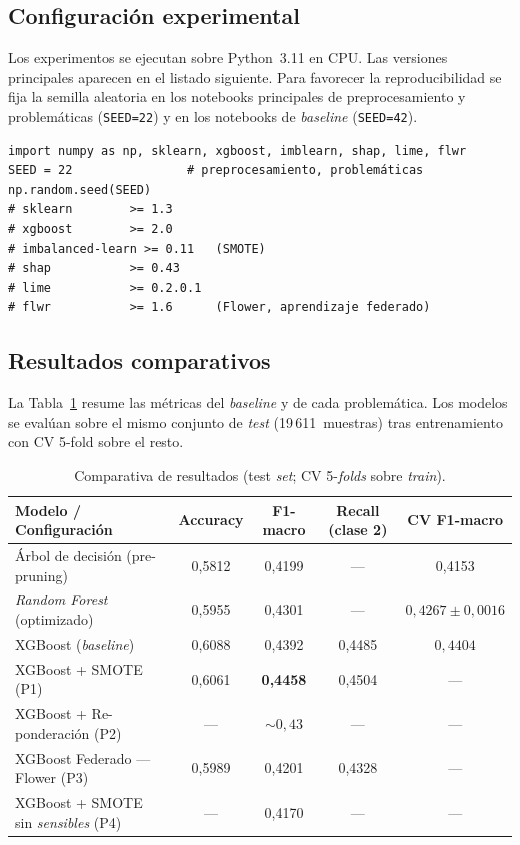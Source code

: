 \documentclass[11pt,a4paper]{article}
\begin{document}
\subsection{Configuración experimental}

Los experimentos se ejecutan sobre Python~3.11 en CPU. Las versiones principales aparecen en el listado siguiente. Para favorecer la reproducibilidad se fija la semilla aleatoria en los notebooks principales de preprocesamiento y problemáticas (\texttt{SEED=22}) y en los notebooks de \textit{baseline} (\texttt{SEED=42}).

\begin{lstlisting}[caption={Semilla aleatoria y versiones principales.}]
import numpy as np, sklearn, xgboost, imblearn, shap, lime, flwr
SEED = 22                # preprocesamiento, problemáticas
np.random.seed(SEED)
# sklearn        >= 1.3
# xgboost        >= 2.0
# imbalanced-learn >= 0.11   (SMOTE)
# shap           >= 0.43
# lime           >= 0.2.0.1
# flwr           >= 1.6      (Flower, aprendizaje federado)
\end{lstlisting}

\subsection{Resultados comparativos}

La Tabla~\ref{tab:resultados} resume las métricas del \textit{baseline} y de cada problemática. Los modelos se evalúan sobre el mismo conjunto de \textit{test} (19\,611~muestras) tras entrenamiento con CV 5-fold sobre el resto.

\begin{table}[H]
\centering
\caption{Comparativa de resultados (test \textit{set}; CV 5-\textit{folds} sobre \textit{train}).}
\label{tab:resultados}
\small
\begin{tabular}{@{}lcccc@{}}
\toprule
\textbf{Modelo / Configuración} & \textbf{Accuracy} & \textbf{F1-macro} & \textbf{Recall (clase 2)} & \textbf{CV F1-macro} \\
\midrule
Árbol de decisión (pre-pruning)        & 0{,}5812 & 0{,}4199 & --- & 0{,}4153 \\
\textit{Random Forest} (optimizado)    & 0{,}5955 & 0{,}4301 & --- & $0{,}4267 \pm 0{,}0016$ \\
XGBoost (\textit{baseline})            & 0{,}6088 & 0{,}4392 & 0{,}4485 & $0{,}4404$ \\
\midrule
XGBoost + SMOTE (P1)                   & 0{,}6061 & \textbf{0{,}4458} & 0{,}4504 & --- \\
XGBoost + Re-ponderación (P2)          & --- & $\sim 0{,}43$ & --- & --- \\
XGBoost Federado --- Flower (P3)       & 0{,}5989 & 0{,}4201 & 0{,}4328 & --- \\
XGBoost + SMOTE sin \textit{sensibles} (P4) & --- & 0{,}4170 & --- & --- \\
\bottomrule
\end{tabular}
\end{table}
\end{document}
